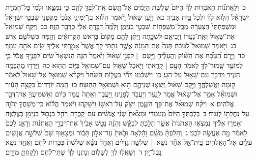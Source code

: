 \documentclass[18pt]{article}
\newcommand{\kri}[1]{\Afootnote{#1}}	%
\begin{document}
 {\loc כ~}וְלָאֲתֹנ֞וֹת הָאֹבְד֣וֹת לְךָ֗ הַיּוֹם֙ שְׁלֹ֣שֶׁת הַיָּמִ֔ים אַל־תָּ֧שֶׂם אֶֽת־לִבְּךָ֛ לָהֶ֖ם כִּ֣י נִמְצָ֑אוּ וּלְמִי֙ כׇּל־חֶמְדַּ֣ת יִשְׂרָאֵ֔ל הֲל֣וֹא לְךָ֔ וּלְכֹ֖ל בֵּ֥ית אָבִֽיךָ׃ \startlock
 {\loc כא~}וַיַּ֨עַן שָׁא֜וּל וַיֹּ֗אמֶר הֲל֨וֹא בֶן־יְמִינִ֤י אָנֹ֙כִי֙ מִקְּטַנֵּי֙ שִׁבְטֵ֣י יִשְׂרָאֵ֔ל וּמִשְׁפַּחְתִּי֙ הַצְּעִרָ֔ה מִכׇּֽל־מִשְׁפְּח֖וֹת שִׁבְטֵ֣י בִנְיָמִ֑ן וְלָ֙מָּה֙ דִּבַּ֣רְתָּ אֵלַ֔י כַּדָּבָ֖ר הַזֶּֽה׃ \startlock
 {\loc כב~}וַיִּקַּ֤ח שְׁמוּאֵל֙ אֶת־שָׁא֣וּל וְאֶֽת־נַעֲר֔וֹ וַיְבִיאֵ֖ם לִשְׁכָּ֑תָה וַיִּתֵּ֨ן לָהֶ֤ם מָקוֹם֙ בְּרֹ֣אשׁ הַקְּרוּאִ֔ים וְהֵ֖מָּה כִּשְׁלֹשִׁ֥ם אִֽישׁ׃ \startlock
 {\loc כג~}וַיֹּ֤אמֶר שְׁמוּאֵל֙ לַטַּבָּ֔ח תְּנָה֙ אֶת־הַמָּנָ֔ה אֲשֶׁ֥ר נָתַ֖תִּי לָ֑ךְ אֲשֶׁר֙ אָמַ֣רְתִּי אֵלֶ֔יךָ שִׂ֥ים אֹתָ֖הּ עִמָּֽךְ׃ \startlock
 {\loc כד~}וַיָּ֣רֶם הַ֠טַּבָּ֠ח אֶת־הַשּׁ֨וֹק וְהֶעָלֶ֜יהָ וַיָּ֣שֶׂם  |  לִפְנֵ֣י שָׁא֗וּל וַיֹּ֙אמֶר֙ הִנֵּ֤ה הַנִּשְׁאָר֙ שִׂים־לְפָנֶ֣יךָ אֱכֹ֔ל כִּ֧י לַמּוֹעֵ֛ד שָֽׁמוּר־לְךָ֥ לֵאמֹ֖ר הָעָ֣ם  |  קָרָ֑אתִי וַיֹּ֧אכַל שָׁא֛וּל עִם־שְׁמוּאֵ֖ל בַּיּ֥וֹם הַהֽוּא׃ \startlock
 {\loc כה~}וַיֵּרְד֥וּ מֵהַבָּמָ֖ה הָעִ֑יר וַיְדַבֵּ֥ר עִם־שָׁא֖וּל עַל־הַגָּֽג׃ \startlock
 {\loc כו~}וַיַּשְׁכִּ֗מוּ וַיְהִ֞י כַּעֲל֤וֹת הַשַּׁ֙חַר֙ וַיִּקְרָ֨א שְׁמוּאֵ֤ל אֶל־שָׁאוּל֙  \edtext{(הגג)}{\kri{קרי: הַגָּ֣גָה}}  לֵאמֹ֔ר ק֖וּמָה וַאֲשַׁלְּחֶ֑ךָּ וַיָּ֣קׇם שָׁא֗וּל וַיֵּצְא֧וּ שְׁנֵיהֶ֛ם ה֥וּא וּשְׁמוּאֵ֖ל הַחֽוּצָה׃ \startlock
 {\loc כז~}הֵ֗מָּה יֽוֹרְדִים֙ בִּקְצֵ֣ה הָעִ֔יר וּשְׁמוּאֵ֞ל אָמַ֣ר אֶל־שָׁא֗וּל אֱמֹ֥ר לַנַּ֛עַר וְיַעֲבֹ֥ר לְפָנֵ֖ינוּ וַֽיַּעֲבֹ֑ר וְאַתָּה֙ עֲמֹ֣ד כַּיּ֔וֹם וְאַשְׁמִיעֲךָ֖ אֶת־דְּבַ֥ר אֱלֹהִֽים׃ 
\startlock
 {\loc א~}וַיִּקַּ֨ח שְׁמוּאֵ֜ל אֶת־פַּ֥ךְ הַשֶּׁ֛מֶן וַיִּצֹ֥ק עַל־רֹאשׁ֖וֹ וַיִּשָּׁקֵ֑הוּ וַיֹּ֕אמֶר הֲל֗וֹא כִּֽי־מְשָׁחֲךָ֧ יְהֹוָ֛ה עַל־נַחֲלָת֖וֹ לְנָגִֽיד׃ \startlock
 {\loc ב~}בְּלֶכְתְּךָ֤ הַיּוֹם֙ מֵֽעִמָּדִ֔י וּמָצָ֩אתָ֩ שְׁנֵ֨י אֲנָשִׁ֜ים עִם־קְבֻרַ֥ת רָחֵ֛ל בִּגְב֥וּל בִּנְיָמִ֖ן בְּצֶלְצַ֑ח וְאָמְר֣וּ אֵלֶ֗יךָ נִמְצְא֤וּ הָאֲתֹנוֹת֙ אֲשֶׁ֣ר הָלַ֣כְתָּ לְבַקֵּ֔שׁ וְהִנֵּ֨ה נָטַ֤שׁ אָבִ֙יךָ֙ אֶת־דִּבְרֵ֣י הָאֲתֹנ֔וֹת וְדָאַ֤ג לָכֶם֙ לֵאמֹ֔ר מָ֥ה אֶעֱשֶׂ֖ה לִבְנִֽי׃ \startlock
 {\loc ג~}וְחָלַפְתָּ֨ מִשָּׁ֜ם וָהָ֗לְאָה וּבָ֙אתָ֙ עַד־אֵל֣וֹן תָּב֔וֹר וּמְצָא֤וּךָ שָּׁם֙ שְׁלֹשָׁ֣ה אֲנָשִׁ֔ים עֹלִ֥ים אֶל־הָאֱלֹהִ֖ים בֵּֽית־אֵ֑ל אֶחָ֞ד נֹשֵׂ֣א  |  שְׁלֹשָׁ֣ה גְדָיִ֗ים וְאֶחָד֙ נֹשֵׂ֗א שְׁלֹ֙שֶׁת֙ כִּכְּר֣וֹת לֶ֔חֶם וְאֶחָ֖ד נֹשֵׂ֥א נֵֽבֶל־יָֽיִן׃ \startlock
 {\loc ד~}וְשָׁאֲל֥וּ לְךָ֖ לְשָׁל֑וֹם וְנָתְנ֤וּ לְךָ֙ שְׁתֵּי־לֶ֔חֶם וְלָקַחְתָּ֖ מִיָּדָֽם׃ \startlock
\end{document}

